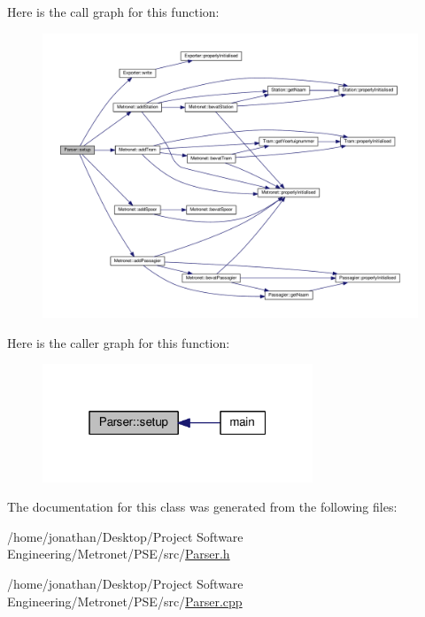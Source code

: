 Here is the call graph for this function\+:
\nopagebreak
\begin{figure}[H]
\begin{center}
\leavevmode
\includegraphics[width=350pt]{class_parser_a96b781357c53e72b5d4a12b5deb7a381_cgraph}
\end{center}
\end{figure}




Here is the caller graph for this function\+:
\nopagebreak
\begin{figure}[H]
\begin{center}
\leavevmode
\includegraphics[width=229pt]{class_parser_a96b781357c53e72b5d4a12b5deb7a381_icgraph}
\end{center}
\end{figure}




The documentation for this class was generated from the following files\+:\begin{DoxyCompactItemize}
\item 
/home/jonathan/\+Desktop/\+Project Software Engineering/\+Metronet/\+P\+S\+E/src/\hyperlink{_parser_8h}{Parser.\+h}\item 
/home/jonathan/\+Desktop/\+Project Software Engineering/\+Metronet/\+P\+S\+E/src/\hyperlink{_parser_8cpp}{Parser.\+cpp}\end{DoxyCompactItemize}
